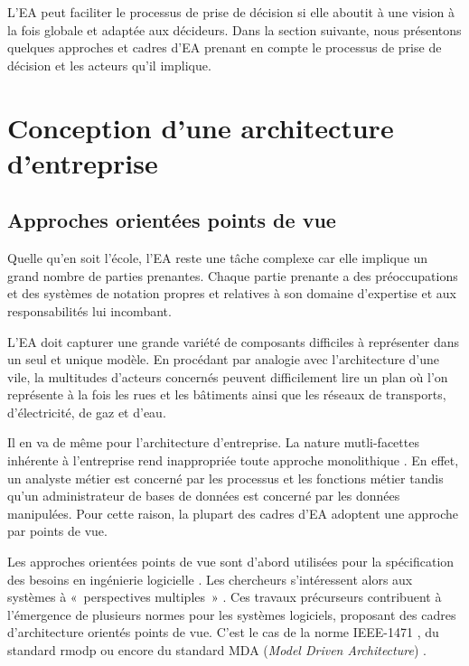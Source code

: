 L'EA peut faciliter le processus de prise de décision si elle aboutit à une
vision à la fois globale et adaptée aux décideurs. Dans la section suivante, nous
présentons quelques approches et cadres d'EA prenant en compte le processus de
prise de décision et les acteurs qu'il implique.

\section{Conception d'une architecture d'entreprise}

\subsection{Approches orientées points de vue}

Quelle qu'en soit l'école, l'EA reste une tâche complexe
\cite{steen2004supporting} car elle implique un grand nombre de parties
prenantes. Chaque partie prenante a des préoccupations et des systèmes de
notation propres et relatives à son domaine d'expertise et aux responsabilités lui
incombant.

L'EA doit capturer une grande variété de composants difficiles à représenter
dans un seul et unique modèle. En procédant par analogie avec l'architecture
d'une vile, la multitudes d'acteurs concernés peuvent difficilement lire un plan où l'on
représente à la fois les rues et les bâtiments ainsi que les réseaux de
transports, d'électricité, de gaz et d'eau. 

Il en va de même pour l'architecture d'entreprise. La nature mutli-facettes
inhérente à l'entreprise rend inappropriée toute approche monolithique
\cite{armour1999bigpicture}. En effet, un analyste métier est concerné par les
processus et les fonctions métier tandis qu'un administrateur de bases de
données est concerné par les données manipulées. Pour cette raison, la plupart des
cadres d'EA adoptent une approche par points de vue.

Les approches orientées points de vue sont d'abord utilisées pour la
spécification des besoins en ingénierie logicielle \cite{mullery1979core}. Les
chercheurs s'intéressent alors aux systèmes à «~perspectives multiples~»
\cite{finkelstein1992viewpoints} \cite{kotonya1996requirements}
\cite{nuseibeh1994multi} \cite{meyers1993representing}. Ces travaux précurseurs
contribuent à l'émergence de plusieurs normes pour les systèmes logiciels,
proposant des cadres d'architecture orientés points de vue. C'est le cas de la
norme IEEE-1471 \cite{hilliard2000ieee}, du standard \gls{rmodp}
\cite{raymond1995reference} ou encore du standard MDA (\textit{Model Driven
Architecture}) \cite{kleppe2003mda}.

